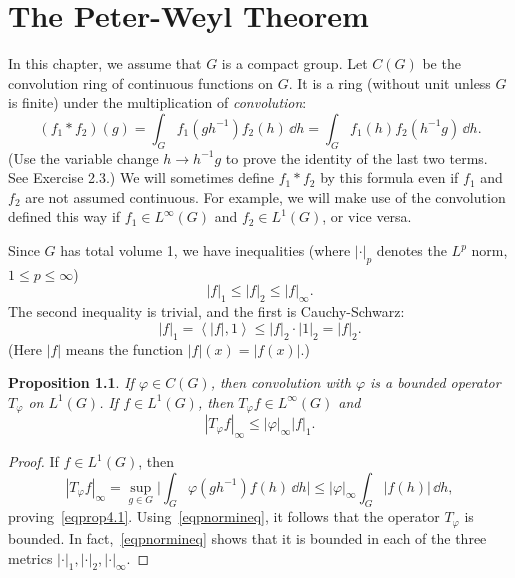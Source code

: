 \documentclass[12pt,reqno]{book}%
\newtheorem{proposition}{Proposition}[chapter]
\theoremstyle{definition}
\theoremstyle{remark}
\theoremstyle{theorem}
\theoremstyle{remark}
\renewcommand{\d}{\dd}
\begin{document}

\chapter{The Peter-Weyl Theorem}\label{}%
In this chapter, we assume that $G$ is a compact group.
Let $C(G)$ be the convolution ring of continuous functions on $G$.
It is a ring (without unit unless $G$ is finite) under the multiplication of \emph{convolution}:
\[
    (f_1 * f_2)(g) = \int_{G} f_1(gh^{-1}) f_2(h) \, \d h = \int_{G} f_1(h) f_2(h^{-1}g) \, \d h.
\]
(Use the variable change $h \to h^{-1}g$ to prove the identity of the last two terms. See Exercise 2.3.)
We will sometimes define $f_1*f_2$ by this formula even if $f_1$ and $f_2$ are not assumed continuous.
For example, we will make use of the convolution defined this way if $f_1 \in L^\infty(G)$ and $f_2 \in L^1(G)$, or vice versa.

Since $G$ has total volume 1, we have inequalities (where $| \cdot |_p$ denotes the $L^p$ norm, $1 \leq p \leq \infty$)
\begin{equation}\label{eqpnormineq}
    |f|_1 \leq |f|_2 \leq |f|_\infty.
\end{equation}
The second inequality is trivial, and the first is Cauchy-Schwarz:
\[
    |f|_1 = {\left\langle |f|, 1\right\rangle} \leq |f|_2 \cdot |1|_2 = |f|_2.
\]
(Here $|f|$ means the function $|f|(x) = |f(x)|$.)

\begin{proposition}\label{prop4.1}%
    If $\varphi \in C(G)$, then convolution with $\varphi$ is a bounded operator $T_\varphi$ on $L^1(G)$.
    If $f \in L^1(G)$, then $T_\varphi f \in L^\infty(G)$ and
    \begin{equation}\label{eqprop4.1}
        |T_\varphi f|_\infty \leq |\varphi|_\infty |f|_1.
    \end{equation}
\end{proposition}%
\begin{proof}%
    If $f \in L^1(G)$, then
    \[
        |T_\varphi f|_\infty = \sup_{g \in G} \bigg|\int_{G} \varphi(gh^{-1}) f(h) \, \d h \bigg| \leq |\varphi|_\infty \int_{G} |f(h)| \, \d h,
    \]
    proving~\eqref{eqprop4.1}.
    Using~\eqref{eqpnormineq}, it follows that the operator $T_\varphi$ is bounded.
    In fact,~\eqref{eqpnormineq} shows that it is bounded in each of the three metrics $| \cdot |_1, | \cdot |_2, | \cdot |_\infty$.
\end{proof}%
\end{document}
